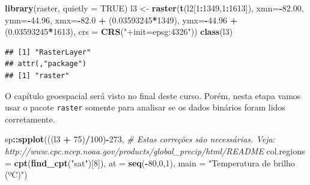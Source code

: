 \documentclass[]{book}
\newenvironment{Shaded}{\begin{snugshade}}{\end{snugshade}}
\newcommand{\KeywordTok}[1]{\textcolor[rgb]{0.13,0.29,0.53}{\textbf{#1}}}
\newcommand{\DataTypeTok}[1]{\textcolor[rgb]{0.13,0.29,0.53}{#1}}
\newcommand{\DecValTok}[1]{\textcolor[rgb]{0.00,0.00,0.81}{#1}}
\newcommand{\FloatTok}[1]{\textcolor[rgb]{0.00,0.00,0.81}{#1}}
\newcommand{\StringTok}[1]{\textcolor[rgb]{0.31,0.60,0.02}{#1}}
\newcommand{\CommentTok}[1]{\textcolor[rgb]{0.56,0.35,0.01}{\textit{#1}}}
\newcommand{\OtherTok}[1]{\textcolor[rgb]{0.56,0.35,0.01}{#1}}
\newcommand{\OperatorTok}[1]{\textcolor[rgb]{0.81,0.36,0.00}{\textbf{#1}}}
\newcommand{\NormalTok}[1]{#1}
\theoremstyle{definition}
\theoremstyle{definition}
\theoremstyle{definition}
\theoremstyle{remark}
\begin{document}
\begin{Shaded}
\begin{Highlighting}[]
\KeywordTok{library}\NormalTok{(raster, }\DataTypeTok{quietly =} \OtherTok{TRUE}\NormalTok{)}
\NormalTok{l3 <-}\StringTok{ }\KeywordTok{raster}\NormalTok{(}\KeywordTok{t}\NormalTok{(l2[}\DecValTok{1}\OperatorTok{:}\DecValTok{1349}\NormalTok{,}\DecValTok{1}\OperatorTok{:}\DecValTok{1613}\NormalTok{]),}
                     \DataTypeTok{xmn=}\OperatorTok{-}\FloatTok{82.00}\NormalTok{,}
                     \DataTypeTok{ymn=}\OperatorTok{-}\FloatTok{44.96}\NormalTok{,}
                     \DataTypeTok{xmx=}\OperatorTok{-}\FloatTok{82.0}  \OperatorTok{+}\StringTok{ }\NormalTok{(}\FloatTok{0.03593245}\OperatorTok{*}\DecValTok{1349}\NormalTok{), }
                     \DataTypeTok{ymx=}\OperatorTok{-}\FloatTok{44.96} \OperatorTok{+}\StringTok{ }\NormalTok{(}\FloatTok{0.03593245}\OperatorTok{*}\DecValTok{1613}\NormalTok{),}
                     \DataTypeTok{crs =} \KeywordTok{CRS}\NormalTok{(}\StringTok{"+init=epsg:4326"}\NormalTok{))}
\KeywordTok{class}\NormalTok{(l3)}
\end{Highlighting}
\end{Shaded}

\begin{verbatim}
## [1] "RasterLayer"
## attr(,"package")
## [1] "raster"
\end{verbatim}

O capítulo geoespacial será visto no final deste curso. Porém, nesta
etapa vamos usar o pacote \texttt{raster} somente para analisar se os
dados binários foram lidos corretamente.

\begin{Shaded}
\begin{Highlighting}[]
\NormalTok{sp}\OperatorTok{::}\KeywordTok{spplot}\NormalTok{(((l3 }\OperatorTok{+}\StringTok{ }\DecValTok{75}\NormalTok{)}\OperatorTok{/}\DecValTok{100}\NormalTok{)}\OperatorTok{-}\DecValTok{273}\NormalTok{, }\CommentTok{# Estas correções são necessárias. Veja: http://www.cpc.ncep.noaa.gov/products/global_precip/html/README}
           \DataTypeTok{col.regions =} \KeywordTok{cpt}\NormalTok{(}\KeywordTok{find_cpt}\NormalTok{(}\StringTok{"sat"}\NormalTok{)[}\DecValTok{8}\NormalTok{]),}
           \DataTypeTok{at =} \KeywordTok{seq}\NormalTok{(}\OperatorTok{-}\DecValTok{80}\NormalTok{,}\DecValTok{0}\NormalTok{,}\DecValTok{1}\NormalTok{),}
           \DataTypeTok{main =} \StringTok{"Temperatura de brilho (ºC)"}\NormalTok{) }
\end{Highlighting}
\end{Shaded}
\end{document}
